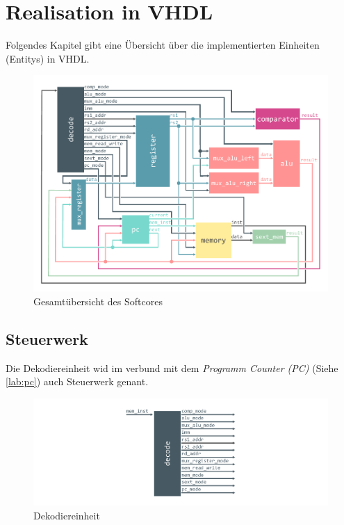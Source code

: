 \chapter{Realisation in VHDL}

    Folgendes Kapitel gibt eine Übersicht über die implementierten Einheiten (Entitys) in VHDL.
    \begin{figure}[H]
        \centering
        \includegraphics[scale=1]{img/OverviewCPU.pdf}
        \caption{Gesamtübersicht des Softcores}
        \label{fig:cpu_overview}
    \end{figure}


    \section{Steuerwerk}

        Die Dekodiereinheit wid im verbund mit dem \textit{Programm Counter (PC)} (Siehe \ref{lab:pc}) auch Steuerwerk genant.

        \begin{figure}[H]
            \centering
            \includegraphics[scale=1]{img/block_decode.pdf}
            \caption{Dekodiereinheit}
            \label{fig:decode}
        \end{figure}

